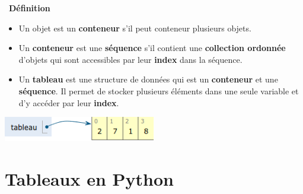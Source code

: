 \documentclass[
  11pt,
]{article}
\providecommand{\tightlist}{%
  \setlength{\itemsep}{0pt}\setlength{\parskip}{0pt}}
\newcounter{def}
\newenvironment{definition}[1]
{\par \medskip   \addtocounter{def}{1} \noindent  
\begin{bclogo}[arrondi =0.1,  ombre = true, barre=none, logo=\bcbook, marge=4]{~\textbf{Définition} \textbf{\thedef} {\itshape #1} }  \par}
{
\end{bclogo}
 \par \bigskip }
\begin{document}
\begin{definition}{}

\begin{itemize}
\tightlist
\item
  Un objet est un \textbf{conteneur} s'il peut conteneur plusieurs
  objets.
\item
  Un \textbf{conteneur} est une \textbf{séquence} s'il contient une
  \textbf{collection ordonnée} d'objets qui sont accessibles par leur
  \textbf{index} dans la séquence.
\item
  Un \textbf{tableau} est une structure de données qui est un
  \textbf{conteneur} et une \textbf{séquence}. Il permet de stocker
  plusieurs éléments dans une seule variable et d'y accéder par leur
  \textbf{index}.
\end{itemize}

\end{definition}

\includegraphics[width=0.5\textwidth,height=\textheight]{images/tableau0.png}\\

\hypertarget{tableaux-en-python}{%
\section{Tableaux en Python}\label{tableaux-en-python}}
\end{document}
